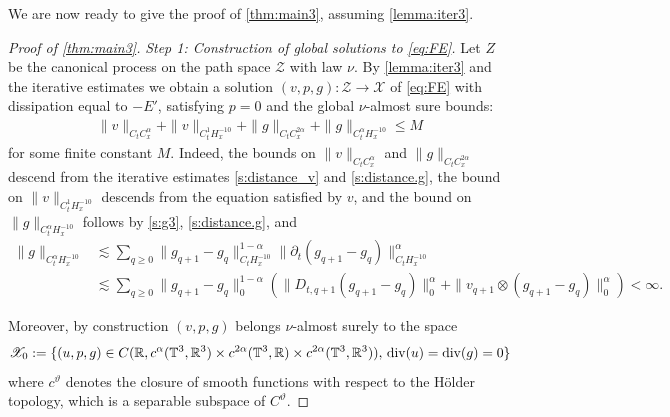 \documentclass[10pt,a4paper]{amsart}
\numberwithin{equation}{section}
\numberwithin{corollario}{section}
\numberwithin{lemma}{section}
\numberwithin{prop}{section}
\theoremstyle{definition}
\theoremstyle{remark}
\newcommand{\R}{\mathbb{R}}
\newcommand{\T}{\mathbb{T}}
\newcommand{\dvg}{\mathord{{\rm div}}}
\newcommand{\qq}{_{q+1}}
\begin{document}
We are now ready to give the proof of \autoref{thm:main3}, assuming \autoref{lemma:iter3}. 
\begin{proof}[Proof of \autoref{thm:main3}]
\textit{Step 1: Construction of global solutions to \eqref{eq:FE}.}
Let $Z$ be the canonical process on the path space $\mathscr{Z}$ with law $\nu$.
By \autoref{lemma:iter3} and the iterative estimates we obtain a solution $(v,p,g):\mathscr{Z} \to \mathscr{X}$ of \eqref{eq:FE} with dissipation equal to $-E'$, satisfying $p=0$ and the global $\nu$-almost sure bounds:
\begin{align} \label{eq:bound.tightness}
   \|v\|_{C_tC^\alpha_x} 
   + \|v\|_{C^1_tH^{-10}_x} 
+ 
\|g\|_{C_tC^{2\alpha}_x} 
+ \|g\|_{C^\alpha_tH^{-10}_x}
\leq 
M 
\end{align}
for some finite constant $M$. 
Indeed, the bounds on $\|v\|_{C_tC^\alpha_x}$ and $\|g\|_{C_tC^{2\alpha}_x}$ descend from the iterative estimates \eqref{s:distance_v} and \eqref{s:distance.g}, 
the bound on $\|v\|_{C^1_tH^{-10}_x}$ descends from the equation satisfied by $v$, and the bound on $\|g\|_{C^\alpha_tH^{-10}_x}$ follows by \eqref{s:g3}, \eqref{s:distance.g}, and
\begin{align}
   \| g\|_{C^\alpha_tH^{-10}_x}
    &\lesssim
   \sum_{q \geq 0} \| g\qq-g_q \|_{C_tH^{-10}_x}^{1-\alpha}  \|\partial_t (g\qq-g_q )\|_{C_tH^{-10}_x}^\alpha
    \\
&\lesssim
    \sum_{q \geq 0}\| g\qq-g_q \|_{0}^{1-\alpha} \left( \|D_{t,q+1} (g\qq-g_q ) \|_0^\alpha + \|v\qq \otimes (g\qq-g_q )\|_0^\alpha \right)
    < \infty.
\end{align}

Moreover, by construction $(v,p,g)$ belongs $\nu$-almost surely to the space
\begin{align}
    \mathscr{X}_0 := \{ (u,p,g) \in C(\R, c^\alpha(\T^3,\R^3) \times  c^{2\alpha}(\T^3,\R) \times  c^{2\alpha}(\T^3,\R^3)), \, \dvg(u)=\dvg(g)=0\}
\end{align}
where $c^\vartheta$ denotes the closure of smooth functions with respect to the H\"older topology, which is a separable subspace of $C^\vartheta$.  



\end{proof}
\end{document}
